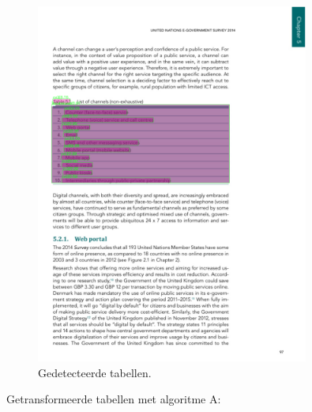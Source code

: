 \begin{figure}[H]
    \centering
    \includegraphics[width=0.8\textwidth]{test-resultaten/1/detected_tables.png}
    \caption{Gedetecteerde tabellen.}
\end{figure}

Getransformeerde tabellen met algoritme A:

